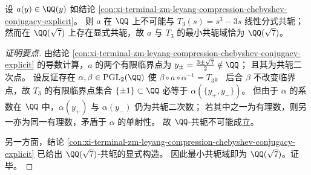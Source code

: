 \begin{conclusion}\label{con:xi-terminal-zm-leyang-compression-minimal-conjugacy-field}
设 \(a(y)\in\QQ(y)\) 如结论 \ref{con:xi-terminal-zm-leyang-compression-chebyshev-conjugacy-explicit}。
则 \(a\) 在 \(\QQ\) 上不可能与 \(T_{3}(s)=s^{3}-3s\) 线性分式共轭；
然而在 \(\QQ(\sqrt7)\) 上存在显式共轭，故 \(a\) 与 \(T_3\) 的最小共轭域恰为 \(\QQ(\sqrt7)\)。
\end{conclusion}
\begin{proof}[证明要点]
由结论 \ref{con:xi-terminal-zm-leyang-compression-chebyshev-conjugacy-explicit} 的导数计算，\(a\) 的两个有限临界点为
\(
y_{\pm}=\frac{3\pm\sqrt7}{2}
\notin\QQ
\)；
且其为共轭二次点。
设反证存在 \(\alpha,\beta\in\mathrm{PGL}_{2}(\QQ)\) 使 \(\beta\circ a\circ\alpha^{-1}=T_{3}\)。
后合 \(\beta\) 不改变临界点，故 \(T_{3}\) 的有限临界点集合 \(\{\pm 1\}\subset\QQ\) 必等于 \(\alpha(\{y_{+},y_{-}\})\)。
但由于 \(\alpha\) 的系数在 \(\QQ\) 中，\(\alpha(y_{+})\) 与 \(\alpha(y_{-})\) 仍为共轭二次数；
若其中之一为有理数，则另一亦为同一有理数，矛盾于 \(\alpha\) 的单射性。
故 \(\QQ\)-共轭不可能成立。
\par
另一方面，结论 \ref{con:xi-terminal-zm-leyang-compression-chebyshev-conjugacy-explicit} 已给出 \(\QQ(\sqrt7)\)-共轭的显式构造。
因此最小共轭域即为 \(\QQ(\sqrt7)\)。证毕。
\end{proof}



\endinput

